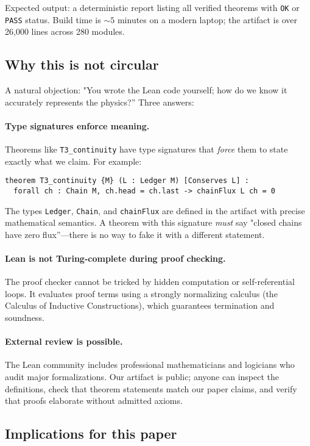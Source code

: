 \documentclass[11pt]{article}
\begin{document}
Expected output: a deterministic report listing all verified theorems with \texttt{OK} or \texttt{PASS} status. Build time is $\sim\!5$ minutes on a modern laptop; the artifact is over 26,000 lines across 280 modules.

\subsection{Why this is not circular}

A natural objection: "You wrote the Lean code yourself; how do we know it accurately represents the physics?'' Three answers:

\paragraph{Type signatures enforce meaning.} Theorems like \texttt{T3\_continuity} have type signatures that \emph{force} them to state exactly what we claim. For example:
\begin{verbatim}
theorem T3_continuity {M} (L : Ledger M) [Conserves L] :
  forall ch : Chain M, ch.head = ch.last -> chainFlux L ch = 0
\end{verbatim}
The types \texttt{Ledger}, \texttt{Chain}, and \texttt{chainFlux} are defined in the artifact with precise mathematical semantics. A theorem with this signature \emph{must} say "closed chains have zero flux''—there is no way to fake it with a different statement.

\paragraph{Lean is not Turing-complete during proof checking.} The proof checker cannot be tricked by hidden computation or self-referential loops. It evaluates proof terms using a strongly normalizing calculus (the Calculus of Inductive Constructions), which guarantees termination and soundness.

\paragraph{External review is possible.} The Lean community includes professional mathematicians and logicians who audit major formalizations. Our artifact is public; anyone can inspect the definitions, check that theorem statements match our paper claims, and verify that proofs elaborate without admitted axioms.

\subsection{Implications for this paper}
\end{document}
